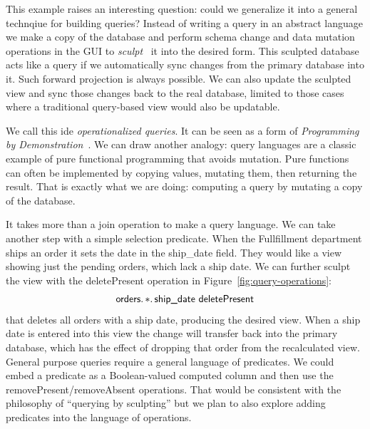 \documentclass[english,submission]{programming}
\theoremstyle{definition}
\begin{document}
This example raises an interesting question: could we generalize it into a general technqiue for building queries? Instead of writing a query in an abstract language we make a copy of the database and perform schema change and data mutation operations in the GUI to \textit{sculpt}~\cite{sculpin} it into the desired form. This sculpted database acts like a query if we automatically sync changes from the primary database into it. Such forward projection is always possible. We can also update the sculpted view and sync those changes back to the real database, limited to those cases where a traditional query-based view would also be updatable.

We call this ide \textit{operationalized queries}. It can be seen as a form of \textit{Programming by Demonstration}~\cite{cypher93-pbd}. We can draw another analogy: query languages are a classic example of pure functional programming that avoids mutation. Pure functions can often be implemented by copying values, mutating them, then returning the result. That is exactly what we are
doing: computing a query by mutating a copy of the database.

It takes more than a join operation to make a query language. We can take another step with a simple selection predicate. When the Fullfillment department ships an order it sets the date in the \textsf{ship\_date} field. They would like a view showing just the pending orders, which lack a ship date. We can further sculpt the view with the \textsf{deletePresent} operation in Figure~\ref{fig:query-operations}:
\[
\textsf{orders}\ldotp * \ldotp \textsf{ship\_date deletePresent} \\
\]
that deletes all orders with a ship date, producing the desired view. When a ship date is entered into this view the change will transfer back into the primary database, which has the effect of dropping that order from the recalculated view.
General purpose queries require a general language of predicates. We could embed a predicate as a Boolean-valued computed column and then use the \textsf{removePresent/removeAbsent} operations. That would be consistent with the philosophy of ``querying by sculpting'' but we plan to also explore adding predicates into the language of operations.
\end{document}
